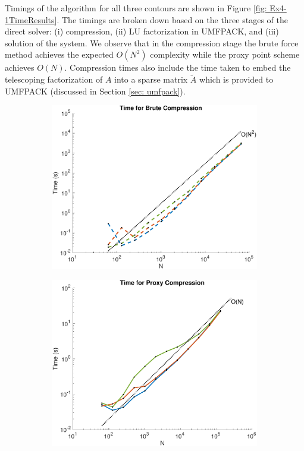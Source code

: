 \documentclass{sfuthesis}
\begin{document}
Timings of the algorithm for all three contours are shown in Figure \ref{fig: Ex4-1TimeResults}. The timings are broken down based on the three stages of the direct solver: (i) compression, (ii) LU factorization in UMFPACK, and (iii) solution of the system. We observe that in the compression stage the brute force method achieves the expected $O(N^2)$ complexity while the proxy point scheme achieves $O(N)$. Compression times also include the time taken to embed the telescoping factorization of $A$ into a sparse matrix $\tilde{A}$ which is provided to UMFPACK (discussed in Section \ref{sec: umfpack}). 
\begin{figure}[h!]
 	\begin{subfigure}{0.5\textwidth}
 		\includegraphics[width=\textwidth]{Ex4-1TimeBruteComp}
 		\caption{}
		\label{fig: Ex4-1TimeBruteComp}
 	\end{subfigure}
	 \begin{subfigure}{0.5\textwidth}
		 \includegraphics[width=\textwidth]{Ex4-1TimeProxyComp}

\end{subfigure}
\end{figure}
\end{document}
